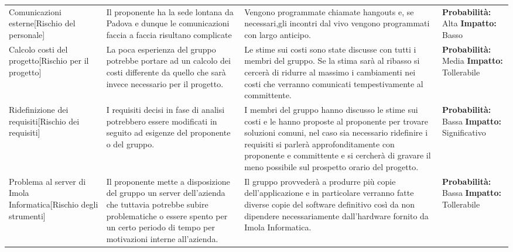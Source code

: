 \documentclass[../piano-di-progetto.tex]{subfiles}
\begin{document}
\begin{longtable}{|p{10em}|p{13em}|p{13em}|p{10em}|}
  Comunicazioni esterne[Rischio del personale] & Il proponente ha la sede lontana da Padova e dunque le comunicazioni faccia a faccia risultano complicate & Vengono programmate chiamate hangouts e, se necessari,gli incontri dal vivo vengono programmati con largo anticipo. & \textbf{Probabilità: }   Alta \textbf{Impatto: }   Basso\\
  Calcolo costi del progetto[Rischio per il progetto] & La poca esperienza del gruppo potrebbe portare ad un calcolo dei costi differente da quello che sarà invece necessario per il progetto. & Le stime sui costi sono state discusse con tutti i membri del gruppo. Se la stima sarà al ribasso si cercerà di ridurre al massimo i cambiamenti nei costi che verranno comunicati tempestivamente al committente. & \textbf{Probabilità: }  Media \textbf{Impatto: } Tollerabile\\
  Ridefinizione dei requisiti[Rischio dei requisiti] & I requisiti decisi in fase di analisi potrebbero essere modificati in seguito ad esigenze del proponente o del gruppo. & I membri del gruppo hanno discusso le stime sui costi e le hanno proposte al proponente per trovare soluzioni comuni, nel caso sia necessario ridefinire i requisiti si parlerà approfonditamente con proponente e committente e si cercherà di gravare il meno possibile sul prospetto orario del progetto. & \textbf{Probabilità: }  Bassa \textbf{Impatto: }  Significativo\\
  Problema al server di Imola Informatica[Rischio degli strumenti] & Il proponente mette a disposizione del gruppo un server dell'azienda che tuttavia potrebbe subire problematiche o essere spento per un certo periodo di tempo per motivazioni interne all'azienda. & Il gruppo provvederà a produrre più copie dell'applicazione e in particolare verranno fatte diverse copie del software definitivo così da non dipendere necessariamente dall'hardware fornito da Imola Informatica. & \textbf{Probabilità: }  Bassa \textbf{Impatto: } Tollerabile\\
  \hline
  \end{longtable}

  
\end{document}

